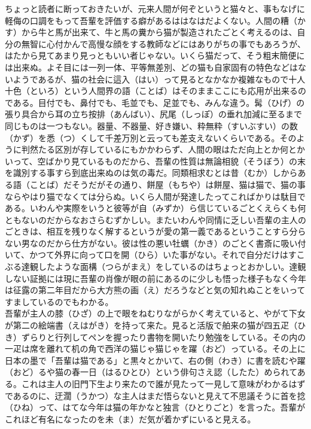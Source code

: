 \documentclass{book}
\begin{document}
ちょっと読者に断っておきたいが、元来人間が何ぞというと猫々と、事もなげに軽侮の口調をもって吾輩を評価する癖があるははなはだよくない。人間の糟（かす）から牛と馬が出来て、牛と馬の糞から猫が製造されたごとく考えるのは、自分の無智に心付かんで高慢な顔をする教師などにはありがちの事でもあろうが、はたから見てあまり見っともいい者じゃない。いくら猫だって、そう粗末簡便には出来ぬ。よそ目には一列一体、平等無差別、どの猫も自家固有の特色などはないようであるが、猫の社会に這入（はい）って見るとなかなか複雑なもので十人十色（といろ）という人間界の語（ことば）はそのままここにも応用が出来るのである。目付でも、鼻付でも、毛並でも、足並でも、みんな違う。髯（ひげ）の張り具合から耳の立ち按排（あんばい）、尻尾（しっぽ）の垂れ加減に至るまで同じものは一つもない。器量、不器量、好き嫌い、粋無粋（すいぶすい）の数（かず）を悉（つ）くして千差万別と云っても差支えないくらいである。そのように判然たる区別が存しているにもかかわらず、人間の眼はただ向上とか何とかいって、空ばかり見ているものだから、吾輩の性質は無論相貌（そうぼう）の末を識別する事すら到底出来ぬのは気の毒だ。同類相求むとは昔（むか）しからある語（ことば）だそうだがその通り、餅屋（もちや）は餅屋、猫は猫で、猫の事ならやはり猫でなくては分らぬ。いくら人間が発達したってこればかりは駄目である。いわんや実際をいうと彼等が自（みずか）ら信じているごとくえらくも何ともないのだからなおさらむずかしい。またいわんや同情に乏しい吾輩の主人のごときは、相互を残りなく解するというが愛の第一義であるということすら分らない男なのだから仕方がない。彼は性の悪い牡蠣（かき）のごとく書斎に吸い付いて、かつて外界に向って口を開（ひら）いた事がない。それで自分だけはすこぶる達観したような面構（つらがまえ）をしているのはちょっとおかしい。達観しない証拠には現に吾輩の肖像が眼の前にあるのに少しも悟った様子もなく今年は征露の第二年目だから大方熊の画（え）だろうなどと気の知れぬことをいってすましているのでもわかる。\\
吾輩が主人の膝（ひざ）の上で眼をねむりながらかく考えていると、やがて下女が第二の絵端書（えはがき）を持って来た。見ると活版で舶来の猫が四五疋（ひき）ずらりと行列してペンを握ったり書物を開いたり勉強をしている。その内の一疋は席を離れて机の角で西洋の猫じゃ猫じゃを躍（おど）っている。その上に日本の墨で「吾輩は猫である」と黒々とかいて、右の側（わき）に書を読むや躍（おど）るや猫の春一日（はるひとひ）という俳句さえ認（したた）められてある。これは主人の旧門下生より来たので誰が見たって一見して意味がわかるはずであるのに、迂濶（うかつ）な主人はまだ悟らないと見えて不思議そうに首を捻（ひね）って、はてな今年は猫の年かなと独言（ひとりごと）を言った。吾輩がこれほど有名になったのを未（ま）だ気が着かずにいると見える。\\
\end{document}
